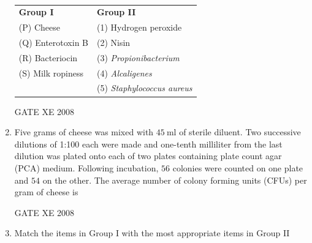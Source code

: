 \documentclass[12pt]{article}
\begin{document}
\begin{enumerate}
\begin{table}[H]     \centering     \caption{}     \label{}     \begin{tabular}{l l}

\textbf{Group I} & \textbf{Group II} \\
(P) Cheese & (1) Hydrogen peroxide \\
(Q) Enterotoxin B & (2) Nisin \\
(R) Bacteriocin & (3) \textit{Propionibacterium} \\
(S) Milk ropiness & (4) \textit{Alcaligenes} \\
 & (5) \textit{Staphylococcus aureus} \\
\end{tabular} \end{table}  

\begin{enumerate}
\end{enumerate}

GATE XE 2008

\item Five grams of cheese was mixed with $45\ \mathrm{ml}$ of sterile diluent. Two successive dilutions of 1:100 each were made and one-tenth milliliter from the last dilution was plated onto each of two plates containing plate count agar (PCA) medium. Following incubation, $56$ colonies were counted on one plate and $54$ on the other. The average number of colony forming units (CFUs) per gram of cheese is

\begin{enumerate}
\end{enumerate}

GATE XE 2008

\item Match the items in Group I with the most appropriate items in Group II  


\end{enumerate}
\end{document}
